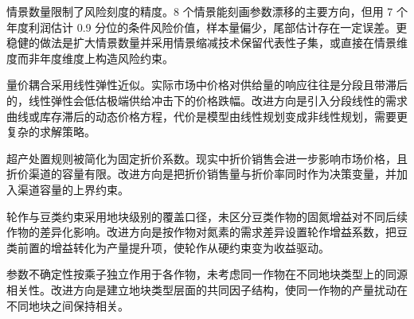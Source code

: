 \documentclass[bwprint]{gmcmthesis}
\begin{document}
情景数量限制了风险刻度的精度。8 个情景能刻画参数漂移的主要方向，但用 7 个年度利润估计 0.9 分位的条件风险价值，样本量偏少，尾部估计存在一定误差。更稳健的做法是扩大情景数量并采用情景缩减技术保留代表性子集，或直接在情景维度而非年度维度上构造风险约束。

量价耦合采用线性弹性近似。实际市场中价格对供给量的响应往往是分段且带滞后的，线性弹性会低估极端供给冲击下的价格跌幅。改进方向是引入分段线性的需求曲线或库存滞后的动态价格方程，代价是模型由线性规划变成非线性规划，需要更复杂的求解策略。

超产处置规则被简化为固定折价系数。现实中折价销售会进一步影响市场价格，且折价渠道的容量有限。改进方向是把折价销售量与折价率同时作为决策变量，并加入渠道容量的上界约束。

轮作与豆类约束采用地块级别的覆盖口径，未区分豆类作物的固氮增益对不同后续作物的差异化影响。改进方向是按作物对氮素的需求差异设置轮作增益系数，把豆类前置的增益转化为产量提升项，使轮作从硬约束变为收益驱动。

参数不确定性按乘子独立作用于各作物，未考虑同一作物在不同地块类型上的同源相关性。改进方向是建立地块类型层面的共同因子结构，使同一作物的产量扰动在不同地块之间保持相关。
\end{document}
